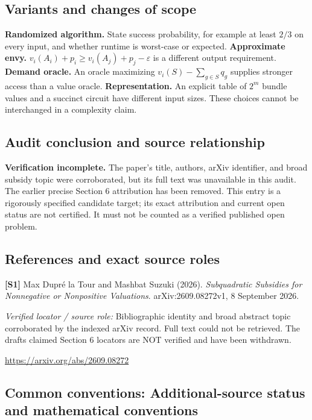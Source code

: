 \documentclass[11pt,a4paper]{article}
\begin{document}
\subsection*{Variants and changes of scope}

\textbf{Randomized algorithm.} State success probability, for example at least $2/3$ on every input, and whether runtime is worst-case or expected. \textbf{Approximate envy.} $v_i(A_i)+p_i\geq v_i(A_j)+p_j-\varepsilon$ is a different output requirement. \textbf{Demand oracle.} An oracle maximizing $v_i(S)-\sum_{g\in S}q_g$ supplies stronger access than a value oracle. \textbf{Representation.} An explicit table of $2^m$ bundle values and a succinct circuit have different input sizes. These choices cannot be interchanged in a complexity claim.

\subsection*{Audit conclusion and source relationship}

\textbf{Verification incomplete.} The paper's title, authors, arXiv identifier, and broad subsidy topic were corroborated, but its full text was unavailable in this audit. The earlier precise Section 6 attribution has been removed. This entry is a rigorously specified candidate target; its exact attribution and current open status are not certified. It must not be counted as a verified published open problem.

\subsection*{References and exact source roles}

{\footnotesize\raggedright
\par\noindent\textbf{[S1]} Max Dupr\'e la Tour and Mashbat Suzuki (2026). \emph{Subquadratic Subsidies for Nonnegative or Nonpositive Valuations}. arXiv:2609.08272v1, 8 September 2026.\par \textit{Verified locator / source role:} Bibliographic identity and broad abstract topic corroborated by the indexed arXiv record. Full text could not be retrieved. The draft\textquotesingle s claimed Section 6 locators are NOT verified and have been withdrawn.\par \url{https://arxiv.org/abs/2609.08272}\par\smallskip
}

\subsection*{Common conventions: Additional-source status and mathematical conventions}
\end{document}

